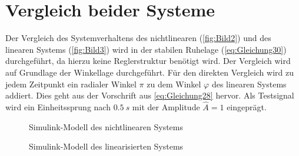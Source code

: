 \section{Vergleich beider Systeme} \label{sec:systemvergleich}

Der Vergleich des Systemverhaltens des nichtlinearen (\autoref{fig:Bild2}) und des linearen Systems (\autoref{fig:Bild3}) wird in der stabilen Ruhelage (\autoref{eq:Gleichung30}) durchgeführt, da hierzu keine Reglerstruktur benötigt wird. Der Vergleich wird auf Grundlage der Winkellage durchgeführt. Für den direkten Vergleich wird zu jedem Zeitpunkt ein radialer Winkel $\pi$ zu dem Winkel $\varphi$ des linearen Systems addiert. Dies geht aus der Vorschrift aus \autoref{eq:Gleichung28} hervor. Als Testsignal wird ein Einheitssprung nach $\SI{0.5}{s}$ mit der Amplitude $\hat{A} = 1$ eingeprägt.

\begin{figure}[H]
   \centering
   \caption[Simulink-Modell des nichtlinearen Systems]{Simulink-Modell des nichtlinearen Systems}
   \label{fig:Bild2}
\end{figure}

\begin{figure}[H]
   \centering
   \caption[Simulink-Modell des linearisierten Systems]{Simulink-Modell des linearisierten Systems}
   \label{fig:Bild3}
\end{figure}

